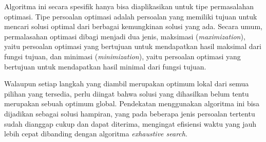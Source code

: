 Algoritma ini secara spesifik hanya bisa diaplikasikan untuk tipe permasalahan optimasi. Tipe persoalan optimasi adalah persoalan yang memiliki tujuan untuk mencari solusi optimal dari berbagai kemungkinan solusi yang ada. Secara umum, permalasahan optimasi dibagi menjadi dua jenis, maksimasi (\textit{maximization}), yaitu persoalan optimasi yang bertujuan untuk mendapatkan hasil maksimal dari fungsi tujuan, dan minimasi (\textit{minimization}), yaitu persoalan optimasi yang bertujuan untuk mendapatkan hasil minimal dari fungsi tujuan. 

Walaupun setiap langkah yang diambil merupakan optimum lokal dari semua pilihan yang tersedia, perlu diingat bahwa solusi yang dihasilkan belum tentu merupakan sebuah optimum global. Pendekatan menggunakan algoritma ini bisa dijadikan sebagai solusi hampiran, yang pada beberapa jenis persoalan tertentu sudah dianggap cukup dan dapat diterima, mengingat efisiensi waktu yang jauh lebih cepat dibanding dengan algoritma \textit{exhaustive search}.

